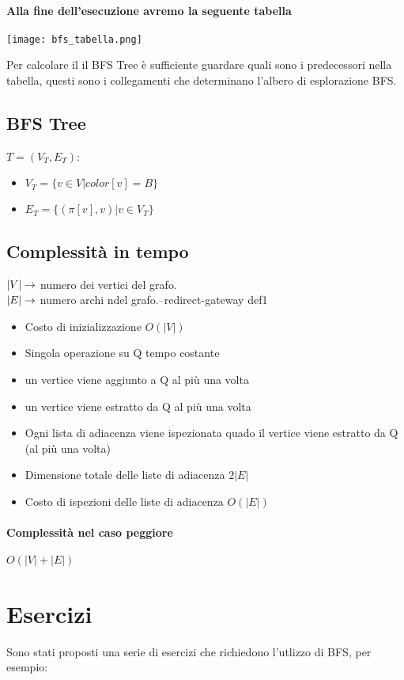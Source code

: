 \paragraph*{Alla fine dell'esecuzione avremo la seguente tabella}
\begin{center}
    \texttt{[image: bfs\_tabella.png]}
\end{center}
Per calcolare il il BFS Tree è sufficiente guardare quali sono i predecessori nella tabella,
questi sono i collegamenti che determinano l'albero di esplorazione BFS.
\subsection{BFS Tree}
$T = (V_T, E_T)$:
\begin{itemize}
    \item $V_T = \{v \in V | color[v] = B\}$
    \item $E_T = \{(\pi[v], v) | v \in V_T\}$
\end{itemize}
\subsection{Complessità in tempo}
$|V| \rightarrow$ numero dei vertici del grafo.\\
$|E| \rightarrow$ numero archi ndel grafo.--redirect-gateway def1
\begin{itemize}
    \item Costo di inizializzazione \ra $O(|V|)$
    \item Singola operazione su Q \ra tempo costante
    \item un vertice viene aggiunto a Q al più una volta
    \item un vertice viene estratto da Q al più una volta
    \item Ogni lista di adiacenza viene ispezionata quado il vertice viene estratto da Q
    (al più una volta)
    \item Dimensione totale delle liste di adiacenza \ra $2|E|$
    \item Costo di ispezioni delle liste di adiacenza \ra $O(|E|)$
\end{itemize}
\paragraph*{Complessità nel caso peggiore} $O(|V|+|E|)$
\section{Esercizi}
Sono stati proposti una serie di esercizi che richiedono l'utlizzo di BFS, per
esempio:
